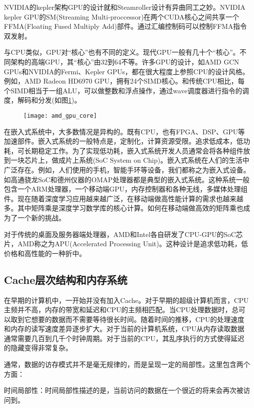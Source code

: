 NVIDIA的kepler架构GPU的设计就和Steamroller设计有异曲同工之妙。NVIDIA kepler GPU的SM(Streaming Multi-proccessor)在两个CUDA核心之间共享一个FFMA(Floating Fused Multiply Add)部件。通过汇编控制码可以控制FFMA指令双发射。

与CPU类似，GPU对“核心”也有不同的定义。现代GPU一般有几十个“核心”。不同架构的高端GPU，其“核心”由32到64不等。许多GPU的设计，如AMD GCN GPUs和NVIDIA的Fermi、Kepler GPUs，都在很大程度上参照CPU的设计风格。例如，AMD Radeon HD6970 GPU，拥有24个SIMD核心。和传统CPU相比，每个SIMD相当于一组ALU，可以做整数和浮点操作，通过wave调度器进行指令的调度，解码和分发(如图\ref{fig:amd_gpu_core})。
\begin{figure}[htbp]
	\centering
	\texttt{[image: amd\_gpu\_core]}
	\label{fig:amd_gpu_core}
\end{figure}

在嵌入式系统中，大多数情况是异构的。既有CPU，也有FPGA、DSP、GPU等加速部件。嵌入式系统的一般特点是，定制化，计算资源受限。追求低成本，低功耗，可长期稳定工作。为了实现低功耗，嵌入式系统开发人员通常会将各种组件放到一块芯片上，做成片上系统(SoC System on Chip)。嵌入式系统在人们的生活中广泛存在。例如，人们使用的手机，智能手环等设备，我们都称之为嵌入式设备。如高通骁龙SoC和德州仪器的OMAP处理器都是典型的嵌入式系统。这种系统一般包含一个ARM处理器，一个移动端GPU，内存控制器和各种无线，多媒体处理组件。现在随着深度学习应用越来越广泛，在移动端做高性能计算的需求也越来越多。其中矩阵乘是深度学习数学库的核心计算。如何在移动端做高效的矩阵乘也成为了一个新的挑战。

对于传统的桌面及服务器端处理器，AMD和Intel各自研发了CPU-GPU的SoC芯片，AMD称之为APU(Accelerated Processing Unit)。这种设计是追求低功耗，低价格和高性能的一种折中。

\subsection{Cache层次结构和内存系统}
在早期的计算机中，一开始并没有加入Cache。对于早期的超级计算机而言，CPU主频并不高，内存的带宽和延迟和CPU的主频相匹配。当CPU处理数据时，总可以取到它想要的数据而不需要等待很长时间。随着时间的推移，CPU的处理速度和内存的读写速度差异逐步扩大。对于当前的计算机系统，CPU从内存读取数据通常需要几百到几千个时钟周期。对于当前的CPU，其乱序执行的方式使得延迟的隐藏变得非常复杂。

通常，数据的访存模式并不是毫无规律的，而是呈现一定的局部性。这里包含两个方面：

时间局部性：时间局部性描述的是，当前访问的数据在一个很近的将来会再次被访问到。

